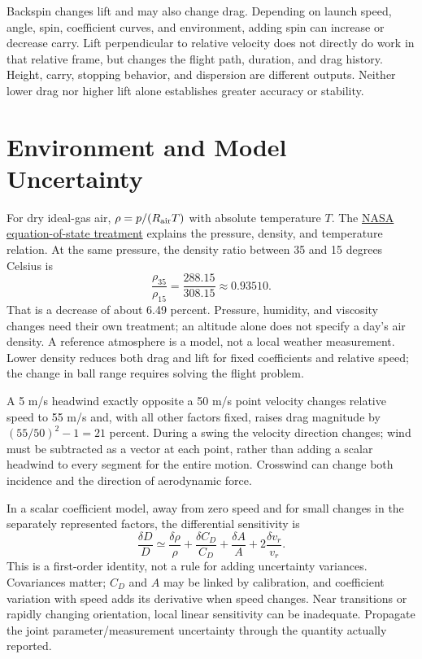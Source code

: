 Backspin changes lift and may also change drag. Depending on launch speed,
angle, spin, coefficient curves, and environment, adding spin can increase or
decrease carry. Lift perpendicular to relative velocity does not directly do
work in that relative frame, but changes the flight path, duration, and drag
history. Height, carry, stopping behavior, and dispersion are different outputs.
Neither lower drag nor higher lift alone establishes greater accuracy or
stability.

\section{Environment and Model Uncertainty}

For dry ideal-gas air, $\rho=p/(R_{\rm air}T)$ with absolute temperature $T$.
The \href{https://www1.grc.nasa.gov/beginners-guide-to-aeronautics/equation-of-state/}{NASA equation-of-state treatment}
explains the pressure, density, and temperature relation. At the same pressure,
the density ratio between 35 and 15 degrees Celsius is
\begin{equation}
 \frac{\rho_{35}}{\rho_{15}}=\frac{288.15}{308.15}\approx0.93510.
 \label{eq:air_density_temperature}
\end{equation}
That is a decrease of about 6.49 percent. Pressure, humidity, and viscosity
changes need their own treatment; an altitude alone does not specify a day's
air density. A reference atmosphere is a model, not a local weather measurement.
Lower density reduces both drag and lift for fixed coefficients and relative
speed; the change in ball range requires solving the flight problem.

A 5 m/s headwind exactly opposite a 50 m/s point velocity changes relative speed
to 55 m/s and, with all other factors fixed, raises drag magnitude by
$(55/50)^2-1=21$ percent. During a swing the velocity direction changes; wind
must be subtracted as a vector at each point, rather than adding a scalar
headwind to every segment for the entire motion. Crosswind can change both
incidence and the direction of aerodynamic force.

In a scalar coefficient model, away from zero speed and for small changes in
the separately represented factors, the differential sensitivity is
\begin{equation}
 \frac{\delta D}{D}\simeq
 \frac{\delta\rho}{\rho}+\frac{\delta C_D}{C_D}
 +\frac{\delta A}{A}+2\frac{\delta v_r}{v_r}.
 \label{eq:drag_sensitivity}
\end{equation}
This is a first-order identity, not a rule for adding uncertainty variances.
Covariances matter; $C_D$ and $A$ may be linked by calibration, and coefficient
variation with speed adds its derivative when speed changes. Near transitions
or rapidly changing orientation, local linear sensitivity can be inadequate.
Propagate the joint parameter/measurement uncertainty through the quantity
actually reported.

